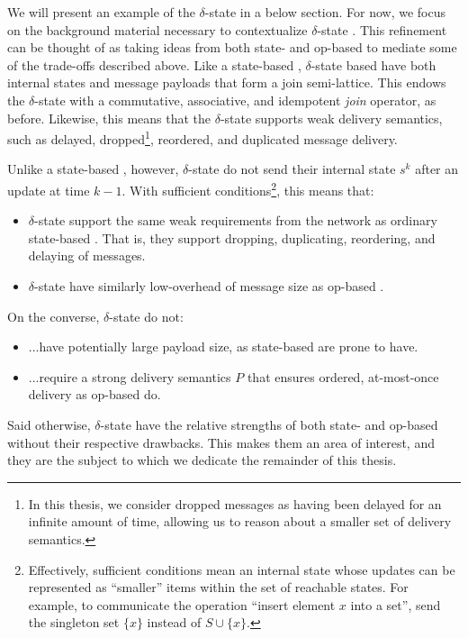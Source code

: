 We will present an example of the $\delta$-state \CRDT in a below section. For
now, we focus on the background material necessary to contextualize
$\delta$-state \CRDTs. This refinement can be thought of as taking ideas from
both state- and op-based \CRDTs to mediate some of the trade-offs described
above. Like a state-based \CRDT, $\delta$-state based \CRDTs have both internal
states and message payloads that form a join semi-lattice. This endows the
$\delta$-state \CRDT with a commutative, associative, and idempotent \emph{join}
operator, as before. Likewise, this means that the $\delta$-state \CRDT supports
weak delivery semantics, such as delayed, dropped\footnote{In this thesis, we
consider dropped messages as having been delayed for an infinite amount of time,
allowing us to reason about a smaller set of delivery semantics.}, reordered,
and duplicated message delivery.

Unlike a state-based \CRDT, however, $\delta$-state \CRDTs do not send their
internal state $s^k$ after an update at time $k-1$. With sufficient
conditions\footnote{Effectively, sufficient conditions mean an internal state
whose updates can be represented as ``smaller'' items within the set of
reachable states. For example, to communicate the operation ``insert element $x$
into a set'', send the singleton set $\{x\}$ instead of $S \cup \{ x \}$.}, this
means that:
\begin{itemize}
  \item $\delta$-state \CRDTs support the same weak requirements from the network
    as ordinary state-based \CRDTs. That is, they support dropping, duplicating,
    reordering, and delaying of messages.
  \item $\delta$-state \CRDTs have similarly low-overhead of message size as
    op-based \CRDTs.
\end{itemize}
On the converse, $\delta$-state \CRDTs do not:
\begin{itemize}
  \item ...have potentially large payload size, as state-based \CRDTs are prone
    to have.
  \item ...require a strong delivery semantics $P$ that ensures ordered,
    at-most-once delivery as op-based \CRDTs do.
\end{itemize}
Said otherwise, $\delta$-state \CRDTs have the relative strengths of both state-
and op-based \CRDTs without their respective drawbacks. This makes them an area
of interest, and they are the subject to which we dedicate the remainder of this
thesis.

